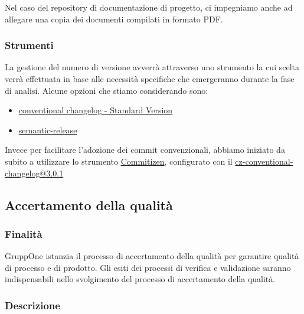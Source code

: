 \documentclass[../norme-di-progetto.tex]{subfiles}
\begin{document}
Nel caso del repository di documentazione di progetto, ci impegniamo anche ad allegare una copia dei documenti compilati in formato PDF\@.


\subsubsection{Strumenti}%
\label{subs:gestione_della_configurazione/strumenti}

La gestione del numero di versione avverrà attraverso uno strumento la cui scelta verrà effettuata in base alle necessità specifiche che emergeranno durante la fase di analisi. Alcune opzioni che stiamo considerando sono:

\begin{itemize}
  \item \href{https://github.com/conventional-changelog/standard-version}{conventional changelog - Standard Version}
  \item \href{https://semantic-release.gitbook.io/semantic-release/}{semantic-release}
\end{itemize}

Invece per facilitare l'adozione dei commit convenzionali, abbiamo iniziato da subito a utilizzare lo strumento \href{https://commitizen.github.io/cz-cli/}{Commitizen}, configurato con il  \href{https://www.npmjs.com/package/cz-conventional-changelog/v/3.0.1}{cz-conventional-changelog@3.0.1}

\subsection{Accertamento della qualità}%
\label{subs:accertamento_della_qualita}

\subsubsection{Finalità}%
\label{subs:accertamento_della_qualita/finalita}

GruppOne istanzia il processo di accertamento della qualità per garantire qualità di processo e di prodotto.
Gli esiti dei processi di verifica e validazione saranno indispensabili nello svolgimento del processo di accertamento della qualità.

\subsubsection{Descrizione}%
\label{subs:accertamento_della_qualita/descrizione}
\end{document}
